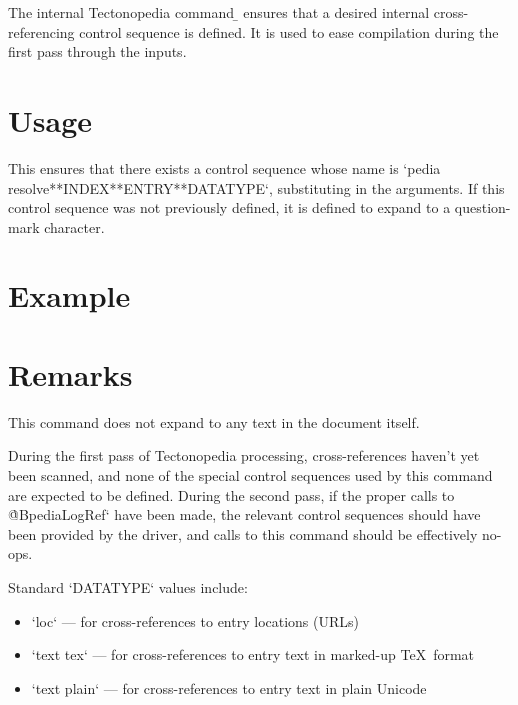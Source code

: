 The internal Tectonopedia command \b{\string\pediaEnsureRefCS} ensures that a
desired internal cross-referencing control sequence is defined. It is used to
ease compilation during the first pass through the inputs.

\section*{Usage}

\begin{texdisp}
\end{texdisp}

This ensures that there exists a control sequence whose name is
\tex`pedia resolve**INDEX**ENTRY**DATATYPE`, substituting in the arguments.
If this control sequence was not previously defined, it is defined to
expand to a question-mark character.

\section*{Example}

\begin{texdisp}
\end{texdisp}

\section*{Remarks}

This command does not expand to any text in the document itself.

During the first pass of Tectonopedia processing, cross-references haven't yet
been scanned, and none of the special control sequences used by this command are
expected to be defined. During the second pass, if the proper calls to
\`@BpediaLogRef` have been made, the relevant control sequences should have been
provided by the driver, and calls to this command should be effectively no-ops.

Standard \tex`DATATYPE` values include:

\begin{itemize}
\item \tex`loc` — for cross-references to entry locations (URLs)
\item \tex`text tex` — for cross-references to entry text in marked-up
    \TeX\ format
\item \tex`text plain` — for cross-references to entry text in
    plain Unicode
\end{itemize}



